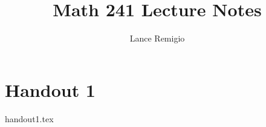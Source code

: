 \documentclass[a4paper]{article}
\title{Math 241 Lecture Notes}
\author{Lance Remigio}
\begin{document}
\maketitle
\tableofcontents

\section{Handout 1}

{handout1.tex}
\end{document}
